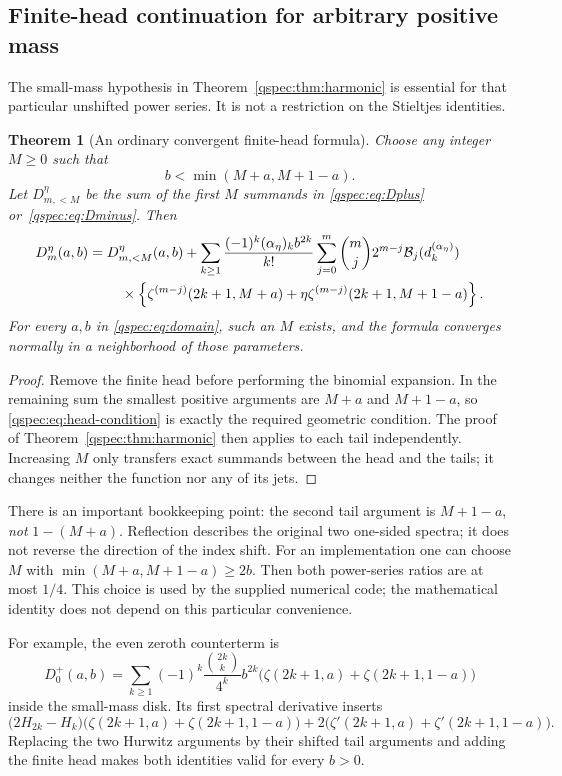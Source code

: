 \documentclass[11pt,letterpaper]{article}
\numberwithin{equation}{section}
\newtheorem{theorem}{Theorem}[section]
\theoremstyle{definition}
\newcommand{\Bcal}{\mathcal B}
\begin{document}
\subsection{Finite-head continuation for arbitrary positive mass}
The small-mass hypothesis in Theorem~\ref{qspec:thm:harmonic} is essential
for that particular unshifted power series. It is not a restriction on
the Stieltjes identities.

\begin{theorem}[An ordinary convergent finite-head formula]
\label{qspec:thm:head}
Choose any integer $M\ge0$ such that
\begin{equation}\label{qspec:eq:head-condition}
b<\min(M+a,M+1-a).
\end{equation}
Let $D_{m,<M}^\eta$ be the sum of the first $M$ summands in
\eqref{qspec:eq:Dplus} or~\eqref{qspec:eq:Dminus}. Then
\begin{align}
D_m^\eta(a,b)={}&D_{m,<M}^\eta(a,b)
+\sum_{k\ge1}\frac{(-1)^k(\alpha_\eta)_k b^{2k}}{k!}
\sum_{j=0}^m\binom mj2^{m-j}\Bcal_j(d_k^{(\alpha_\eta)})\notag\\
&\quad\times\left\{\zeta^{(m-j)}(2k+1,M+a)
+\eta\zeta^{(m-j)}(2k+1,M+1-a)\right\}.
\label{qspec:eq:finite-head}
\end{align}
For every $a,b$ in \eqref{qspec:eq:domain}, such an $M$ exists, and the
formula converges normally in a neighborhood of those parameters.
\end{theorem}
\begin{proof}
Remove the finite head before performing the binomial expansion. In the
remaining sum the smallest positive arguments are $M+a$ and $M+1-a$,
so \eqref{qspec:eq:head-condition} is exactly the required geometric
condition. The proof of Theorem~\ref{qspec:thm:harmonic} then applies to
each tail independently. Increasing $M$ only transfers exact summands
between the head and the tails; it changes neither the function nor any
of its jets.
\end{proof}

There is an important bookkeeping point: the second tail argument is
$M+1-a$, \emph{not} $1-(M+a)$. Reflection describes the original two
one-sided spectra; it does not reverse the direction of the index shift.
For an implementation one can choose $M$ with
$\min(M+a,M+1-a)\ge2b$. Then both power-series ratios are at most $1/4$.
This choice is used by the supplied numerical code; the mathematical
identity does not depend on this particular convenience.

For example, the even zeroth counterterm is
\[
D_0^+(a,b)=\sum_{k\ge1}(-1)^k\frac{\binom{2k}{k}}{4^k}b^{2k}
\bigl(\zeta(2k+1,a)+\zeta(2k+1,1-a)\bigr)
\]
inside the small-mass disk. Its first spectral derivative inserts
\[
\bigl(2H_{2k}-H_k\bigr)
\bigl(\zeta(2k+1,a)+\zeta(2k+1,1-a)\bigr)
+2\bigl(\zeta'(2k+1,a)+\zeta'(2k+1,1-a)\bigr).
\]
Replacing the two Hurwitz arguments by their shifted tail arguments and
adding the finite head makes both identities valid for every $b>0$.
\end{document}
